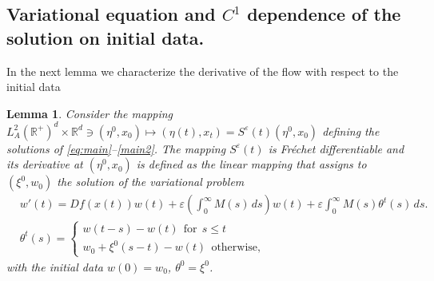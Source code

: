 \documentclass[11pt, leqno]{amsart}
\newtheorem{lem}[thm]{Lemma}
\theoremstyle{definition}
\def\R{\mathbb{R}}
\begin{document}
\subsection{Variational equation and $C^1$ dependence of the solution on initial data.} In the next lemma we characterize the derivative of the flow with respect to the initial data
	\begin{lem}\label{variational}
		Consider the mapping  $ L^2_A(\R^+)^d \times \R^d\ni (\eta^0,x_0)\mapsto (\eta(t),x_t)=S^\varepsilon(t)(\eta^0,x_0)$ defining the solutions of  \eqref{eq:main}--\eqref{main2}. The mapping $S^\varepsilon(t)$ is Fr\'{e}chet differentiable and its derivative at $(\eta^0,x_0)$ is defined as the linear mapping that assigns to $(\xi^0,w_0)$ the solution of the variational problem
		\begin{align}
			& w'(t) =  Df(x(t)) w(t)  + \varepsilon  \left(\int_0^\infty M(s)\, ds\right)  w(t) + \varepsilon \int_0^\infty M(s) \theta^t(s)\, ds.\label{weq_glob_2} \\
		&
		\theta^t(s) = \begin{cases} w(t-s) - w(t)\ \ \textrm{for}\ \ s\leq t\\
			w_0+\xi^0(s-t) - w(t)\ \ \textrm{otherwise},
		\end{cases}\label{variational:2}
		\end{align}
		with the initial data $w(0)=w_0$, $\theta^0=\xi^0$.
	\end{lem}
\end{document}
